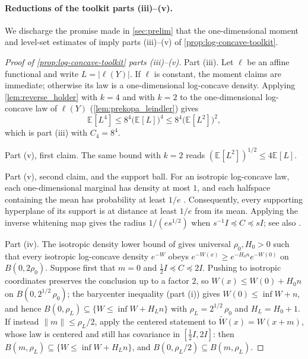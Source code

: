 \documentclass[11pt]{article}
\numberwithin{equation}{section}
\theoremstyle{definition}
\newcommand{\E}[2]{\mathbb{E}_{#1}\left[#2\right]}
\begin{document}
\paragraph{Reductions of the toolkit parts (iii)--(v).}
We discharge the promise made in \cref{sec:prelim} that the one-dimensional
moment and level-set estimates of \cite{LV07:journal} imply parts (iii)--(v) of
\cref{prop:log-concave-toolkit}.
\begin{proof}[Proof of \cref{prop:log-concave-toolkit} parts
\textnormal{(iii)--(v)}] Part (iii).
Let $\ell$ be an affine functional and write
$L=|\ell(Y)|$.
If $\ell$ is constant, the moment claims are immediate; otherwise its law
is a one-dimensional log-concave density.
Applying \cref{lem:reverse_holder} with $k=4$ and with
$k=2$ to the one-dimensional log-concave law of
$\ell(Y)$ (\cref{lem:prekopa_leindler}) gives
\[
\E{}{L^4}
\leq 8^4\bigl(\E{}{L}\bigr)^4
\leq 8^4\bigl(\E{}{L^2}\bigr)^2,
\]
which is part (iii) with $C_4=8^4$.

Part (v), first claim.
The same bound with $k=2$ reads
$(\E{}{L^2})^{1/2}\leq 4\E{}{L}$.

Part (v), second claim, and the support ball.
For an isotropic log-concave law, each one-dimensional marginal has density
at most $1$, and each halfspace containing the mean has probability at
least $1/e$ \cite[Lemmas~5.5(a) and~5.12]{LV07:journal}.
Consequently, every supporting hyperplane of its support is at distance
at least $1/e$ from its mean.
Applying the inverse whitening map gives the radius
$1/(es^{1/2})$ when $s^{-1}I\preceq C\preceq sI$;
see also \cite[Lemma~A.10]{KV25}.

Part (iv).
The isotropic density lower bound of
\cite[Theorem~5.14(a)]{LV07:journal} gives universal
$\rho_0,H_0>0$ such that every isotropic
log-concave density
$e^{-W}$ obeys
$e^{-W(x)}\geq e^{-H_0n}e^{-W(0)}$ on
$B(0,2\rho_0)$.
Suppose first that $m=0$ and
$\frac12I\preceq C\preceq2I$.
Pushing to isotropic coordinates preserves the conclusion up to a factor $2$, so
$W(x)\leq W(0)+H_0n$ on
$B(0,2^{1/2}\,\rho_0)$; the barycenter inequality (part (i)) gives
$W(0)\leq\inf W+n$, and hence
$B(0,\rho_L)\subseteq\{W\leq\inf W+H_Ln\}$ with
$\rho_L=2^{1/2}\,\rho_0$ and
$H_L=H_0+1$.
If instead $\|m\|\leq\rho_L/2$, apply the centered statement to
$\widetilde W(x)=W(x+m)$, whose law is centered and still has covariance in
$[\frac12I,2I]$: then
$B(m,\rho_L)\subseteq\{W\leq\inf W+H_Ln\}$, and
$B(0,\rho_L/2)\subseteq B(m,\rho_L)$.
\end{proof}
\end{document}
